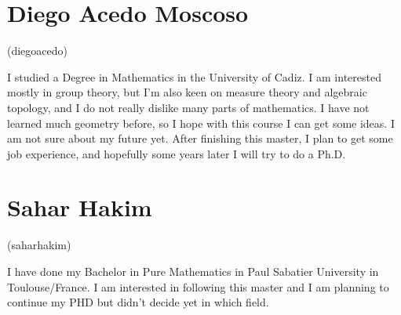 \documentclass[11pt]{amsart}
\begin{document}
\section*{Diego Acedo Moscoso}
(diegoacedo)

I studied a Degree in Mathematics in the University of Cadiz. I am interested mostly in group theory, but I'm also keen on measure theory and algebraic topology, and I do not really dislike many parts of mathematics. I have not learned much geometry before, so I hope with this course I can get some ideas.
I am not sure about my future yet. After finishing this master, I plan to get some job experience, and hopefully some years later I will try to do a Ph.D.

\section*{Sahar Hakim}
(saharhakim)

I have done my Bachelor in Pure Mathematics in Paul Sabatier University in Toulouse/France. I am interested in following this master and I am planning to continue my PHD but didn't decide yet in which field.
\end{document}
